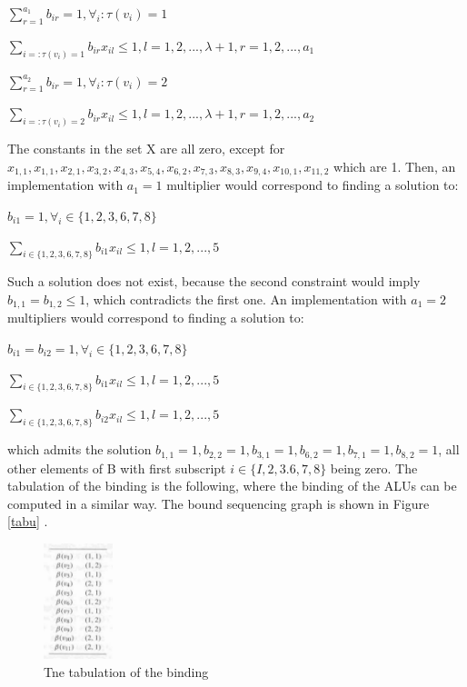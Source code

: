 \begin{center}

$ \sum_{r=1}^{a_{1}} b_{ir} = 1,\forall_{i} : \tau(v_{i})=1 $

$ \sum_{i=:\tau(v_{i})=1}^{} b_{ir} x_{il} \leq 1, l=1,2,...,\lambda + 1, r=1,2,...,a_{1}$

$ \sum_{r=1}^{a_{2}} b_{ir} = 1,\forall_{i} : \tau(v_{i})=2$

$ \sum_{i=:\tau(v_{i})=2}^{} b_{ir} x_{il} \leq 1, l=1,2,...,\lambda + 1, r=1,2,...,a_{2}$
\end{center}


The constants in the set X are all zero, except for $ x_{1,1},x_{1,1},x_{2,1},x_{3,2},x_{4,3},x_{5,4},x_{6,2},x_{7,3},x_{8,3},x_{9,4},x_{10,1},x_{11,2} $ which are 1. Then, an implementation with $ a_{1} =1$ multiplier would correspond to finding a 
solution to: 

\begin{center}

$ b_{i1} = 1, \forall_{i} \in \{1,2,3,6,7,8\} $

$ \sum_{i\in \{1,2,3,6,7,8\}}^{} b_{i1} x_{il} \leq 1, l=1,2,...,5$
\end{center}

Such a solution does not exist, because the second constraint would imply $ b_{1,1}=b_{1,2} \leq 1 $, which contradicts the first one. An implementation with $ a_{1} =2$ multipliers would correspond to finding a solution to:

\begin{center}

$ b_{i1}=b_{i2} = 1, \forall_{i} \in \{1,2,3,6,7,8\} $

$ \sum_{i\in \{1,2,3,6,7,8\}}^{} b_{i1} x_{il} \leq 1, l=1,2,...,5$

$ \sum_{i\in \{1,2,3,6,7,8\}}^{} b_{i2} x_{il} \leq 1, l=1,2,...,5$
\end{center} 

which admits the solution $ b_{1,1}=1,b_{2,2}=1,b_{3,1}=1,b_{6,2}=1,b_{7,1}=1,b_{8,2}=1 $, all other elements of B with first subscript $ i \in \{I, 2,3.6,7,8\}$ being zero. The tabulation of the binding is the following, where the binding of the ALUs can be computed in a similar way. The bound sequencing graph is shown in Figure \ref{tabu} . 

\begin{figure}[h]
    \centering
    \includegraphics[width=0.18\textwidth]{tabu}
    \caption{ Tne tabulation of the binding \cite{b1}}
    \label{fig:tabu}
\end{figure}

